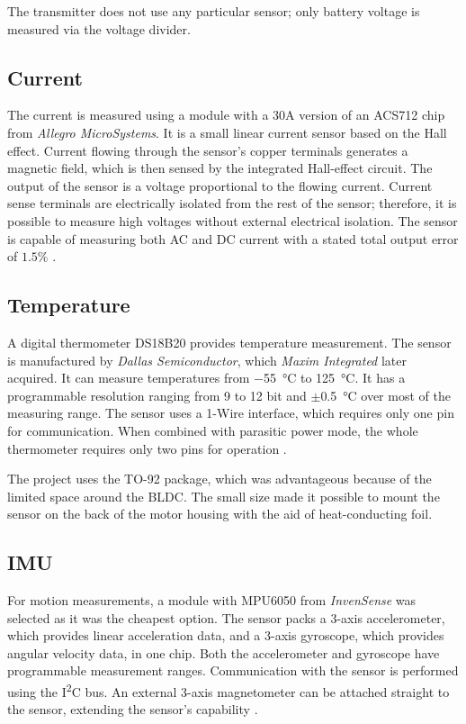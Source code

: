 The transmitter does not use any particular sensor; only battery voltage is measured via the voltage divider.

\subsection{Current}		%
The current is measured using a module with a 30A version of an ACS712 chip from \textit{Allegro MicroSystems}. It is a small linear current sensor based on the Hall effect. Current flowing through the sensor's copper terminals generates a magnetic field, which is then sensed by the integrated Hall-effect circuit. The output of the sensor is a voltage proportional to the flowing current. Current sense terminals are electrically isolated from the rest of the sensor; therefore, it is possible to measure high voltages without external electrical isolation. The sensor is capable of measuring both AC and DC current with a stated total output error of $1.5\%$ \cite{acs_datasheet}. 

\subsection{Temperature}	%
A digital thermometer DS18B20 provides temperature measurement. The sensor is manufactured by \textit{Dallas Semiconductor}, which \textit{Maxim Integrated} later acquired. It can measure temperatures from \SI{-55}{\degreeCelsius} to \SI{125}{\degreeCelsius}. It has a programmable resolution ranging from 9 to 12 bit and $\pm$\SI{0.5}{\degreeCelsius} over most of the measuring range. The sensor uses a 1-Wire interface, which requires only one pin for communication. When combined with parasitic power mode, the whole thermometer requires only two pins for operation \cite{ds_datasheet}.

The project uses the TO-92 package, which was advantageous because of the limited space around the BLDC. The small size made it possible to mount the sensor on the back of the motor housing with the aid of heat-conducting foil.

\subsection{IMU}			%
For motion measurements, a module with MPU6050 from \textit{InvenSense} was selected as it was the cheapest option. The sensor packs a 3-axis accelerometer, which provides linear acceleration data, and a 3-axis gyroscope, which provides angular velocity data, in one chip. Both the accelerometer and gyroscope have programmable measurement ranges. Communication with the sensor is performed using the I\textsuperscript{2}C bus. An external 3-axis magnetometer can be attached straight to the sensor, extending the sensor's capability \cite{mpu_datasheet}.

